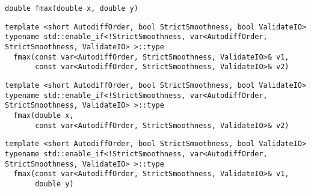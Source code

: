 \begin{tcolorbox}[colback=white,colframe=gray90, coltitle=black,boxrule=3pt,
fonttitle=\bfseries,title= Fmax]

\begin{verbatim}
double fmax(double x, double y)

\end{verbatim}

\begin{verbatim}
template <short AutodiffOrder, bool StrictSmoothness, bool ValidateIO>
typename std::enable_if<!StrictSmoothness, var<AutodiffOrder, StrictSmoothness, ValidateIO> >::type
  fmax(const var<AutodiffOrder, StrictSmoothness, ValidateIO>& v1,
       const var<AutodiffOrder, StrictSmoothness, ValidateIO>& v2)

\end{verbatim}

\begin{verbatim}
template <short AutodiffOrder, bool StrictSmoothness, bool ValidateIO>
typename std::enable_if<!StrictSmoothness, var<AutodiffOrder, StrictSmoothness, ValidateIO> >::type
  fmax(double x,
       const var<AutodiffOrder, StrictSmoothness, ValidateIO>& v2)

\end{verbatim}

\begin{verbatim}
template <short AutodiffOrder, bool StrictSmoothness, bool ValidateIO>
typename std::enable_if<!StrictSmoothness, var<AutodiffOrder, StrictSmoothness, ValidateIO> >::type
  fmax(const var<AutodiffOrder, StrictSmoothness, ValidateIO>& v1,
       double y)

\end{verbatim}

\end{tcolorbox}

